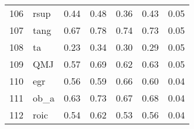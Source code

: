 \documentclass[12pt]{article}
\begin{document}
\begin{footnotesize}
\begin{longtable}{rl|c|c|c|c|c}
106 & rsup             & 0.44                                                                                      & 0.48                                                                                        & 0.36                                                                                         & 0.43 & 0.05               \\
107 & tang             & 0.67                                                                                      & 0.78                                                                                        & 0.74                                                                                         & 0.73 & 0.05               \\
108 & ta               & 0.23                                                                                      & 0.34                                                                                        & 0.30                                                                                         & 0.29 & 0.05               \\
109 & QMJ              & 0.57                                                                                      & 0.69                                                                                        & 0.62                                                                                         & 0.63 & 0.05               \\
110 & egr              & 0.56                                                                                      & 0.59                                                                                        & 0.66                                                                                         & 0.60 & 0.04               \\
111 & ob\_a            & 0.63                                                                                      & 0.73                                                                                        & 0.67                                                                                         & 0.68 & 0.04               \\
112 & roic             & 0.54                                                                                      & 0.62                                                                                        & 0.53                                                                                         & 0.56 & 0.04               \\

\end{longtable}
\end{footnotesize}
\end{document}
